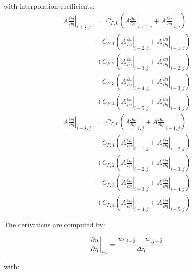 with interpolation coefficients:
\begin{eqnarray}
\left. A\frac{\partial u}{\partial \eta}\right|_{i+\frac{1}{2},j}&=
C_{P,0}\left(\left. A\frac{\partial u}{\partial \eta}\right|_{i+1,j}+\left. A\frac{\partial u}{\partial \eta}\right|_{i,j} \right)\\ \nonumber
&-C_{P,1}\left(\left. A\frac{\partial u}{\partial \eta}\right|_{i+2,j}+\left. A\frac{\partial u}{\partial \eta}\right|_{i-1,j} \right)\\ \nonumber
&+C_{P,2}\left(\left. A\frac{\partial u}{\partial \eta}\right|_{i+3,j}+\left. A\frac{\partial u}{\partial \eta}\right|_{i-2,j} \right)\\ \nonumber
&-C_{P,3}\left(\left. A\frac{\partial u}{\partial \eta}\right|_{i+4,j}+\left. A\frac{\partial u}{\partial \eta}\right|_{i-3,j} \right)\\ \nonumber
&+C_{P,4}\left(\left. A\frac{\partial u}{\partial \eta}\right|_{i+5,j}+\left. A\frac{\partial u}{\partial \eta}\right|_{i-4,j} \right)
\\
\left. A\frac{\partial u}{\partial \eta}\right|_{i-\frac{1}{2},j}&=
C_{P,0}\left(\left. A\frac{\partial u}{\partial \eta}\right|_{i,j}+\left. A\frac{\partial u}{\partial \eta}\right|_{i-1,j} \right)\\ \nonumber
&-C_{P,1}\left(\left. A\frac{\partial u}{\partial \eta}\right|_{i+1,j}+\left. A\frac{\partial u}{\partial \eta}\right|_{i-2,j} \right)\\ \nonumber
&+C_{P,2}\left(\left. A\frac{\partial u}{\partial \eta}\right|_{i+2,j}+\left. A\frac{\partial u}{\partial \eta}\right|_{i-3,j} \right)\\ \nonumber
&-C_{P,3}\left(\left. A\frac{\partial u}{\partial \eta}\right|_{i+3,j}+\left. A\frac{\partial u}{\partial \eta}\right|_{i-4,j} \right)\\ \nonumber
&+C_{P,4}\left(\left. A\frac{\partial u}{\partial \eta}\right|_{i+4,j}+\left. A\frac{\partial u}{\partial \eta}\right|_{i-5,j} \right)
\end{eqnarray}

The derivations are computed by:

\begin{equation}
\left. \frac{\partial u}{\partial \eta}\right|_{i,j}=\frac{u_{i,j+\frac{1}{2}}-u_{i,j-\frac{1}{2}}}{\varDelta \eta}\\
\end{equation}

with:

